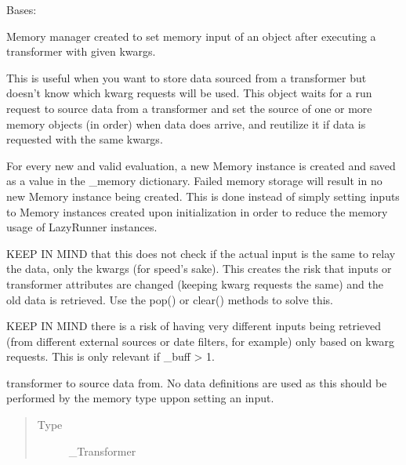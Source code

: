 \documentclass[letterpaper,10pt,english]{sphinxmanual}
\begin{document}
\begin{fulllineitems}
\label{\detokenize{dalio.base:dalio.base.memory.LazyRunner}}
Bases: 

Memory manager created to set memory input of an object after
executing a transformer with given kwargs.

This is useful when you want to store data sourced from a transformer but
doesn’t know which kwarg requests will be used. This object waits for
a run request to source data from a transformer and set the source of
one or more memory objects (in order) when data does arrive, and reutilize
it if data is requested with the same kwargs.

For every new and valid evaluation, a new Memory instance is created and
saved as a value in the \_memory dictionary. Failed memory storage will
result in no new Memory instance being created. This is done instead of
simply setting inputs to Memory instances created upon initialization in
order to reduce the memory usage of LazyRunner instances.

KEEP IN MIND that this does not check if the actual input is the same to
relay the data, only the kwargs (for speed’s sake). This creates the risk
that inputs or transformer attributes are changed (keeping kwarg requests
the same) and the old data is retrieved. Use the pop() or clear() methods
to solve this.

KEEP IN MIND there is a risk of having very different inputs being
retrieved (from different external sources or date filters, for example)
only based on kwarg requests. This is only relevant if \_buff \textgreater{} 1.

\begin{fulllineitems}
\label{\detokenize{dalio.base:dalio.base.memory.LazyRunner._source}}
transformer to source data from. No data
definitions are used as this should be performed by the memory
type uppon setting an input.
\begin{quote}\begin{description}
\item[{Type}] \leavevmode
\_Transformer


\end{description}
\end{quote}
\end{fulllineitems}
\end{fulllineitems}
\end{document}
